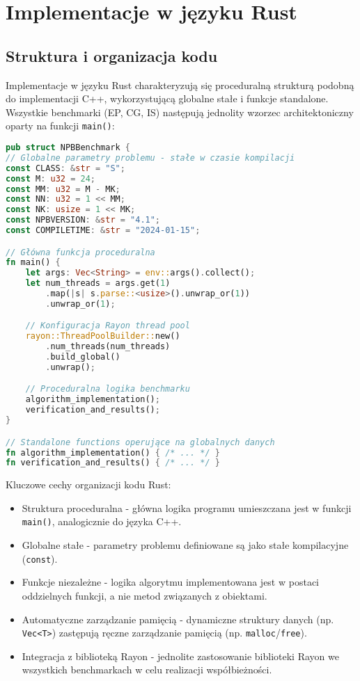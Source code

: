\section{Implementacje w języku Rust}
\subsection{Struktura i organizacja kodu}
Implementacje w języku Rust charakteryzują się proceduralną strukturą podobną do implementacji C++, wykorzystującą globalne stałe i funkcje standalone. Wszystkie benchmarki (EP, CG, IS) następują jednolity wzorzec architektoniczny oparty na funkcji \texttt{main()}:

\begin{lstlisting}[language=Rust, caption={Struktura kodu benchmarków w języku Rust}, label={lst:rust_structure}]
pub struct NPBBenchmark {
// Globalne parametry problemu - stałe w czasie kompilacji
const CLASS: &str = "S";
const M: u32 = 24;
const MM: u32 = M - MK;
const NN: u32 = 1 << MM;
const NK: usize = 1 << MK;
const NPBVERSION: &str = "4.1";
const COMPILETIME: &str = "2024-01-15";

// Główna funkcja proceduralna
fn main() {
    let args: Vec<String> = env::args().collect();
    let num_threads = args.get(1)
        .map(|s| s.parse::<usize>().unwrap_or(1))
        .unwrap_or(1);

    // Konfiguracja Rayon thread pool
    rayon::ThreadPoolBuilder::new()
        .num_threads(num_threads)
        .build_global()
        .unwrap();

    // Proceduralna logika benchmarku
    algorithm_implementation();
    verification_and_results();
}

// Standalone functions operujące na globalnych danych
fn algorithm_implementation() { /* ... */ }
fn verification_and_results() { /* ... */ }
\end{lstlisting}
Kluczowe cechy organizacji kodu Rust:
\begin{itemize}
\item Struktura proceduralna - główna logika programu umieszczana jest w funkcji \texttt{main()}, analogicznie do języka C++.
\item Globalne stałe - parametry problemu definiowane są jako stałe kompilacyjne (\texttt{const}).
\item Funkcje niezależne - logika algorytmu implementowana jest w postaci oddzielnych funkcji, a nie metod związanych z obiektami.
\item Automatyczne zarządzanie pamięcią - dynamiczne struktury danych (np. \texttt{Vec<T>}) zastępują ręczne zarządzanie pamięcią (np. \texttt{malloc}/\texttt{free}).
\item Integracja z biblioteką Rayon - jednolite zastosowanie biblioteki Rayon we wszystkich benchmarkach w celu realizacji współbieżności.
\end{itemize}


